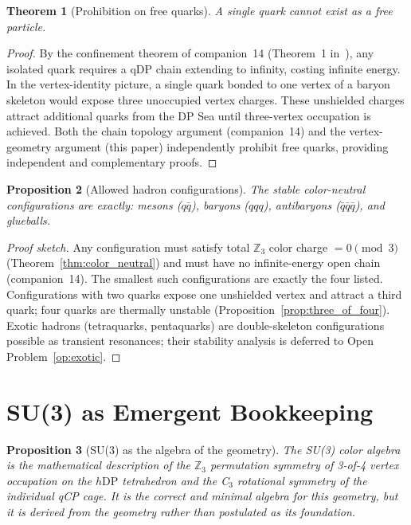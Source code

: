\documentclass[12pt]{article}
\newtheorem{theorem}{Theorem}[section]
\newtheorem{proposition}[theorem]{Proposition}
\newcommand{\hDP}{h\mathrm{DP}}
\begin{document}
\begin{theorem}[Prohibition on free quarks]
\label{thm:no_free_quark}
A single quark cannot exist as a free particle.
\end{theorem}

\begin{proof}
By the confinement theorem of companion~14 (Theorem~1 in~\cite{c14}),
any isolated quark requires a qDP chain extending to infinity, costing
infinite energy.  In the vertex-identity picture, a single quark
bonded to one vertex of a baryon skeleton would expose three
unoccupied vertex charges.  These unshielded charges attract
additional quarks from the DP Sea until three-vertex occupation is
achieved.  Both the chain topology argument (companion~14) and the
vertex-geometry argument (this paper) independently prohibit free
quarks, providing independent and complementary proofs.
\end{proof}

\begin{proposition}[Allowed hadron configurations]
\label{prop:allowed_configs}
The stable color-neutral configurations are exactly: mesons ($q\bar{q}$),
baryons ($qqq$), antibaryons ($\bar{q}\bar{q}\bar{q}$), and glueballs.
\end{proposition}

\begin{proof}[Proof sketch]
Any configuration must satisfy total $\mathbb{Z}_3$ color charge
$= 0 \pmod{3}$ (Theorem~\ref{thm:color_neutral}) and must have no
infinite-energy open chain (companion~14).  The smallest such
configurations are exactly the four listed.  Configurations with
two quarks expose one unshielded vertex and attract a third quark;
four quarks are thermally unstable (Proposition~\ref{prop:three_of_four}).
Exotic hadrons (tetraquarks, pentaquarks) are double-skeleton
configurations possible as transient resonances; their stability
analysis is deferred to Open Problem~\ref{op:exotic}.
\end{proof}

\section{SU(3) as Emergent Bookkeeping}
\label{sec:su3}

\begin{proposition}[SU(3) as the algebra of the geometry]
\label{prop:su3_bookkeeping}
The SU(3) color algebra is the mathematical description of the
$\mathbb{Z}_3$ permutation symmetry of 3-of-4 vertex occupation on
the $\hDP$ tetrahedron and the C$_3$ rotational symmetry of the
individual qCP cage.  It is the correct and minimal algebra for this
geometry, but it is derived from the geometry rather than postulated
as its foundation.
\end{proposition}
\end{document}
